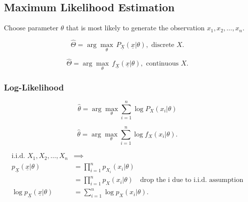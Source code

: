 \subsection{Maximum Likelihood Estimation}
\begin{motivation}
    Choose parameter $\theta$ that is most likely to generate the observation $x_1,x_2,\ldots,x_n$.
\end{motivation}

\begin{definition}
    \begin{equation}
        \hat{\Theta} = \arg\max_\theta \, P_{\underline{X}}(\underline{x}|\theta), \text{ discrete } X.
    \end{equation}
        
    \begin{equation}
        \hat{\Theta} = \arg\max_\theta \, f_{\underline{X}}(\underline{x}|\theta), \text{ continuous } X.
    \end{equation}
        
\end{definition}

\subsubsection{Log-Likelihood}
\begin{definition}
    \begin{equation}
        \hat{\theta} = \arg\max_\theta \sum_{i=1}^n \log P_X(x_i|\theta) 
    \end{equation}

    \begin{equation}
        \hat{\theta} = \arg\max_\theta \sum_{i=1}^n \log f_X(x_i|\theta).
    \end{equation}    
\end{definition}

\begin{derivation}
    \begin{align*}
        \text{i.i.d. } X_1, X_2, \dots, X_n &\implies \\
        p_{\underline{X}}(\underline{x} | \theta) &= \prod_{i=1}^n p_{X_i}(x_i | \theta) \\
        &= \prod_{i=1}^n p_X(x_i | \theta) \quad \text{drop the i due to i.i.d. assumption}\\
        \log p_{\underline{X}}(\underline{x} | \theta) &= \sum_{i=1}^n \log p_X(x_i | \theta).
    \end{align*}
\end{derivation}

